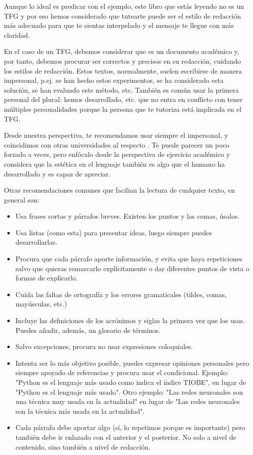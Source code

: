 {Aunque lo ideal es predicar con el ejemplo, este libro que estás leyendo no es un TFG y por eso hemos considerado que tutearte puede ser el estilo de redacción más adecuado para que te sientas interpelado y el mensaje te llegue con más claridad. 

En el caso de un TFG, debemos considerar que es un documento académico y, por tanto, debemos procurar ser correctos y precisos en su redacción, cuidando los estilos de redacción. Estos textos, normalmente, suelen escribirse de manera impersonal, p.ej. se han hecho estos experimentos, se ha considerado esta solución, se han evaluado este método, etc. También es común usar la primera personal del plural: hemos desarrollado, etc. que no entra en conflicto con tener múltiples personalidades porque la persona que te tutoriza está implicada en el TFG. 

Desde nuestra perspectiva, te recomendamos usar siempre el impersonal, y coincidimos con otras universidades al respecto \cite{UPC-guia}. Te puede parecer un poco forzado a veces, pero enfócalo desde la perspectiva de ejercicio académico y considera que la estética en el lenguaje también es algo que el humano ha desarrollado y es capaz de apreciar.

Otras recomendaciones comunes que facilian la lectura de cualquier texto, en general son:
\begin{itemize}
    \item Usa frases cortas y párrafos breves. Existen los puntos y las comas, úsalos.
    \item Usa listas (como esta) para presentar ideas, luego siempre puedes desarrollarlas.
    \item Procura que cada párrafo aporte información, y evita que haya repeticiones salvo que quieras remarcarlo explícitamente o dar diferentes puntos de vista o formas de explicarlo.  
    \item Cuida las faltas de ortografía y los errores gramaticales (tildes, comas, mayúsculas, etc.)
    \item Incluye las definiciones de los acrónimos y siglas la primera vez que los usas. Puedes añadir, además, un glosario de términos.
    \item Salvo excepciones, procura no usar expresiones coloquiales.
    \item Intenta ser lo más objetivo posible, puedes expresar opiniones personales pero siempre apoyado de referencias y procura usar el condicional. Ejemplo: "Python es el lenguaje más usado como indica el índice TIOBE", en lugar de "Python es el lenguaje más usado". Otro ejemplo: "Las redes neuronales son una técnica muy usada en la actualidad" en lugar de "Las redes neuronales son la técnica más usada en la actualidad".
    \item Cada párrafo debe aportar algo (sí, lo repetimos porque es importante) pero también debe ir enlazado con el anterior y el posterior. No solo a nivel de contenido, sino también a nivel de redacción.
\end{itemize}

}
